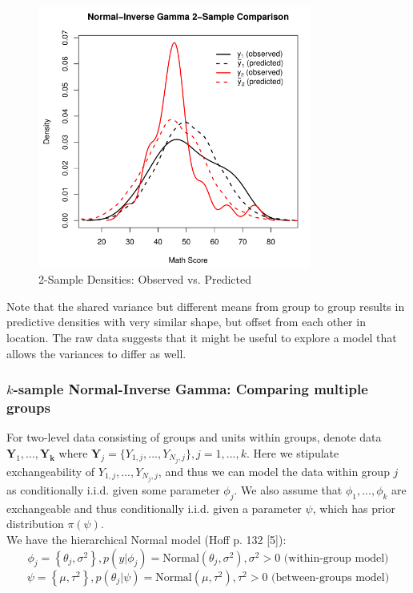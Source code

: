 \documentclass[12pt, a4paper]{article}
\begin{document}
\begin{figure}[ht]
  \centering
  \includegraphics[width=0.8\textwidth]{./Graphics/ExamplePlots/NormIG2_Data_v_Prediction}
  \caption{2-Sample Densities: Observed vs. Predicted}
  \label{fig:NormIG2_DvP}
\end{figure}


\noindent Note that the shared variance but different means from group to group results in predictive densities with very similar shape, but offset from each other in location.  The raw data suggests that it might be useful to explore a model that allows the variances to differ as well.\\

    \subsubsection{$k$-sample Normal-Inverse Gamma:  Comparing multiple groups}

    For two-level data consisting of groups and units within groups, denote data $\mathbf{Y}_1,...,\mathbf{Y_k}$ where $\mathbf{Y}_j = \{Y_{1,j},...,Y_{N_j,j}\}, j=1,...,k$. Here we stipulate exchangeability of $Y_{1,j},...,Y_{N_j,j}$, and thus we can model the data within group $j$ as conditionally i.i.d. given some parameter $\phi_j$.  We also assume that $\phi_1,...,\phi_k$ are exchangeable and thus conditionally i.i.d. given a parameter $\psi$, which has prior distribution $\pi(\psi)$.\\

\noindent We have the hierarchical Normal model (Hoff p. 132 [5]):
    $$\phi_j = \left\{\theta_j,\sigma^2\right\}, p\left(y|\phi_j\right) = \text{Normal}\left(\theta_j,\sigma^2\right), \sigma^2 > 0 \text{ (within-group model)}$$
    $$\psi = \left\{\mu,\tau^2\right\}, p\left(\theta_j|\psi\right) = \text{Normal}\left(\mu,\tau^2\right), \tau^2 > 0 \text{ (between-groups model)}$$
\end{document}
